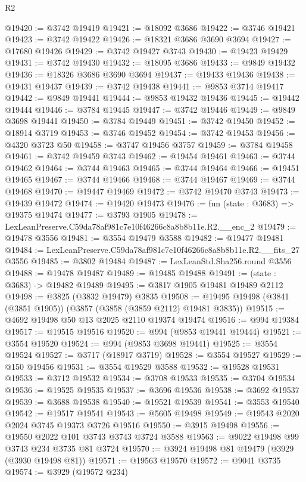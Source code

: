 \begin{lexlean}{R2}
\begin{coremodule}
@19420 := @3742 @19419
@19421 := @18092 @3686
@19422 := @3746 @19421
@19423 := @3742 @19422
@19426 := @18321 @3686 @3690 @3694
@19427 := @17680 @19426
@19429 := @3742 @19427 @3743
@19430 := @19423 @19429
@19431 := @3742 @19430
@19432 := @18095 @3686
@19433 := @9849 @19432
@19436 := @18326 @3686 @3690 @3694
@19437 := @19433 @19436
@19438 := @19431 @19437
@19439 := @3742 @19438
@19441 := @9853 @3714 @19417
@19442 := @9849 @19441
@19444 := @9853 @19432 @19436
@19445 := @19442 @19444
@19446 := @3784 @19445
@19447 := @3742 @19446
@19449 := @9849 @3698 @19441
@19450 := @3784 @19449
@19451 := @3742 @19450
@19452 := @18914 @3719
@19453 := @3746 @19452
@19454 := @3742 @19453
@19456 := @4320 @3723 @50
@19458 := @3747 @19456 @3757
@19459 := @3784 @19458
@19461 := @3742 @19459 @3743
@19462 := @19454 @19461
@19463 := @3744 @19462
@19464 := @3744 @19463
@19465 := @3744 @19464
@19466 := @19451 @19465
@19467 := @3744 @19466
@19468 := @3744 @19467
@19469 := @3744 @19468
@19470 := @19447 @19469
@19472 := @3742 @19470 @3743
@19473 := @19439 @19472
@19474 := @19420 @19473
@19476 := fun (state : @3683) => @19375 @19474
@19477 := @3793 @1905
@19478 := LexLeanPreserve.C59da78af981c7e10f46266c8a8b8b11e.R2.__enc_2
@19479 := @19478 @3556
@19481 := @3554 @19479 @3588
@19482 := @19477 @19481
@19484 := LexLeanPreserve.C59da78af981c7e10f46266c8a8b8b11e.R2.__fits_27 @3556
@19485 := @3802 @19484
@19487 := LexLeanStd.Sha256.round @3556
@19488 := @19478 @19487
@19489 := @19485 @19488
@19491 := (state : @3683) -> @19482 @19489
@19495 := @3817 @1905 @19481 @19489 @2112
@19498 := @3825 (@3832 @19479) @3835
@19508 := @19495 @19498 (@3841 (@3851 @1905)) (@3857 (@3858 (@3859 @2112) @19481 @3835))
@19515 := @4692 @19498 @50 @13 @2025 @2110 @19374 @19474
@19516 := @994 @19384
@19517 := @19515 @19516
@19520 := @994 (@9853 @19441 @19444)
@19521 := @3554 @19520
@19524 := @994 (@9853 @3698 @19441)
@19525 := @3554 @19524
@19527 := @3717 (@18917 @3719)
@19528 := @3554 @19527
@19529 := @150 @19456
@19531 := @3554 @19529 @3588
@19532 := @19528 @19531
@19533 := @3712 @19532
@19534 := @3708 @19533
@19535 := @3704 @19534
@19536 := @19525 @19535
@19537 := @3696 @19536
@19538 := @3692 @19537
@19539 := @3688 @19538
@19540 := @19521 @19539
@19541 := @3553 @19540
@19542 := @19517 @19541
@19543 := @5605 @19498
@19549 := @19543 @2020 @2024 @3745 @19373 @3726 @19516
@19550 := @3915 @19498
@19556 := @19550 @2022 @101 @3743 @3743 @3724 @3588
@19563 := @9022 @19498 @99 @3743 @234 @3735 @81 @3724
@19570 := @3924 @19498 @81 @19479 (@3929 (@3930 @19498 @81))
@19571 := @19563 @19570
@19572 := @9041 @3735
@19574 := @3929 (@19572 @234)

\end{coremodule}
\end{lexlean}
